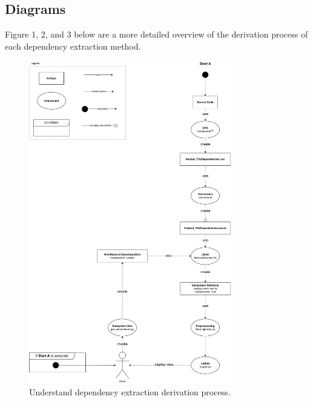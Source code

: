 \documentclass[12pt, dvipsnames, a4paper]{article}
\begin{document}
\subsection{Diagrams}
Figure 1, 2, and 3 below are a more detailed overview of the derivation process of each dependency extraction method.
\begin{figure}[!htb]
	\center
	\includegraphics[width = 250pt]{assets/derivation/understad.pdf}
	\caption{Understand dependency extraction derivation process.\cite{understand}\cite{sourcecode}}
\end{figure}
\end{document}
